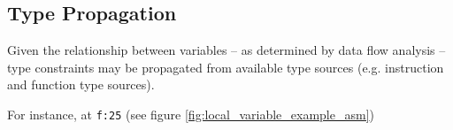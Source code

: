 
\subsection{Type Propagation}


Given the relationship between variables -- as determined by data flow analysis -- type constraints may be propagated from available type sources (e.g. instruction and function type sources).

For instance, at \texttt{f:25} (see figure \ref{fig:local_variable_example_asm}) 


 \cite{milner_algorithmw}
